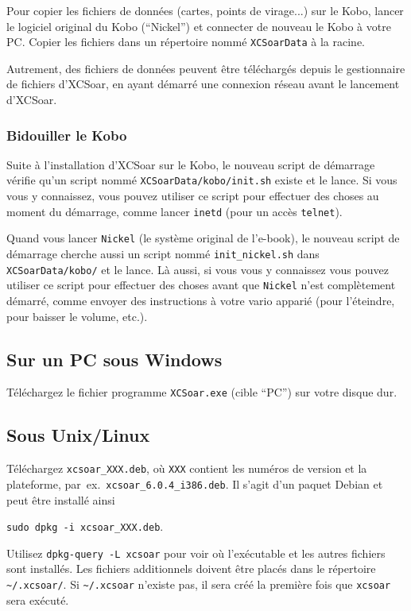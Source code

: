 Pour copier les fichiers de données (cartes, points de virage...) sur le Kobo, lancer le 
logiciel original du Kobo (``Nickel'') et connecter de nouveau le Kobo à votre PC.
Copier les fichiers dans un répertoire nommé \texttt{XCSoarData} à la racine.

Autrement, des fichiers de données peuvent être téléchargés depuis le gestionnaire de fichiers d'XCSoar,
en ayant démarré une connexion réseau avant le lancement d'XCSoar.

\subsubsection{Bidouiller le Kobo}

Suite à l'installation d'XCSoar sur le Kobo, le nouveau script de démarrage vérifie qu'un
script nommé \texttt{XCSoarData/kobo/init.sh} existe et le lance. Si
vous vous y connaissez, vous pouvez utiliser ce script pour effectuer des choses au
moment du démarrage, comme lancer \texttt{inetd} (pour un accès \texttt{telnet}).

Quand vous lancer \texttt{Nickel} (le système original de l'e-book), le nouveau
script de démarrage cherche aussi un script nommé \texttt{init\_nickel.sh}
dans \texttt{XCSoarData/kobo/} et le lance. Là aussi, si 
vous vous y connaissez vous pouvez utiliser ce script pour effectuer des choses
avant que \texttt{Nickel} n'est complètement démarré, comme envoyer des instructions
à votre vario apparié (pour l'éteindre, pour baisser le volume, etc.).

\subsection*{Sur un PC sous Windows}

Téléchargez le fichier programme \verb|XCSoar.exe| (cible ``PC'') sur votre disque dur.

\subsection*{Sous Unix/Linux}

Téléchargez \verb|xcsoar_XXX.deb|, où \verb|XXX| contient les numéros de version et la plateforme, par~ex.\ \verb|xcsoar_6.0.4_i386.deb|.
Il s'agit d'un paquet Debian et peut être installé ainsi 
\begin{center}
\verb|sudo dpkg -i xcsoar_XXX.deb|.
\end{center}
Utilisez \verb|dpkg-query -L xcsoar| pour voir où l'exécutable et les autres fichiers sont installés.
Les fichiers additionnels doivent être placés dans le répertoire
\verb|~/.xcsoar/|.
Si \verb|~/.xcsoar| n'existe pas, il sera créé la première fois que \verb|xcsoar| sera exécuté.

